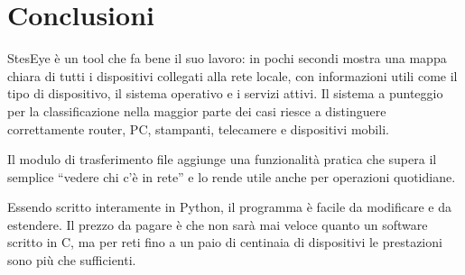 \documentclass[a4paper,11pt]{article}
\begin{document}
\section{Conclusioni}

StesEye è un tool che fa bene il suo lavoro: in pochi secondi
mostra una mappa chiara di tutti i dispositivi collegati alla rete
locale, con informazioni utili come il tipo di dispositivo, il
sistema operativo e i servizi attivi.  Il sistema a punteggio per
la classificazione nella maggior parte dei casi riesce a
distinguere correttamente router, PC, stampanti, telecamere e
dispositivi mobili.

Il modulo di trasferimento file aggiunge una funzionalità pratica
che supera il semplice ``vedere chi c'è in rete'' e lo rende
utile anche per operazioni quotidiane.

Essendo scritto interamente in Python, il programma è facile da
modificare e da estendere.  Il prezzo da pagare è che non sarà
mai veloce quanto un software scritto in C, ma per reti fino a
un paio di centinaia di dispositivi le prestazioni sono più che
sufficienti.
\end{document}
